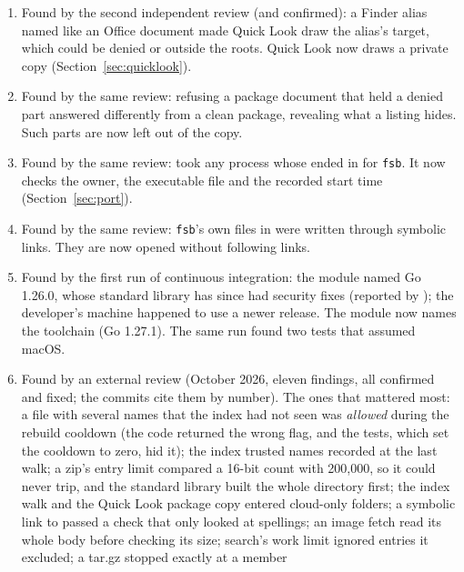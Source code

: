 \begin{enumerate}
        encrypted PDF, after which no key reached the interface, so arrowing through a folder
        stopped dead on that file.  Focus now returns to the list unless the user clicked or
        tabbed into the viewer.
  \item Found by the second independent review (and confirmed): a Finder alias named like an
        Office document made Quick Look draw the alias's target, which could be denied or outside
        the roots.  Quick Look now draws a private copy (Section~\ref{sec:quicklook}).
  \item Found by the same review: refusing a package document that held a denied part answered
        differently from a clean package, revealing what a listing hides.  Such parts are now
        left out of the copy.
  \item Found by the same review:  took any process whose  ended in
         for \texttt{fsb}.  It now checks the owner, the executable file and the
        recorded start time (Section~\ref{sec:port}).
  \item Found by the same review: \texttt{fsb}'s own files in  were
        written through symbolic links.  They are now opened without following links.
  \item Found by the first run of continuous integration: the module named Go 1.26.0, whose
        standard library has since had security fixes (reported by ); the
        developer's machine happened to use a newer release.  The module now names the
        toolchain (Go 1.27.1).  The same run found two tests that assumed macOS.
  \item Found by an external review (October 2026, eleven findings, all confirmed and fixed;
        the commits cite them by number).  The ones that mattered most: a file with several names that
        the index had not seen was \emph{allowed} during the rebuild cooldown (the code returned the
        wrong flag, and the tests, which set the cooldown to zero, hid it); the index trusted names
        recorded at the last walk; a zip's entry limit compared a 16-bit count with 200{,}000, so it
        could never trip, and the standard library built the whole directory first; the index walk and
        the Quick Look package copy entered cloud-only folders; a symbolic link to \code{/} passed a
        check that only looked at spellings; an image fetch read its whole body before checking its
        size; search's work limit ignored entries it excluded; a tar.gz stopped exactly at a member

\end{enumerate}

